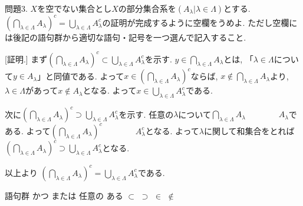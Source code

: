 \documentclass[dvipdfmx,a4paper,11pt]{article}
\theoremstyle{definition}
\begin{document}

\medskip
問題3.  $X$を空でない集合とし$X$の部分集合系を$(A_{\lambda} | \lambda \in \Lambda)$とする. $(\bigcap_{\lambda \in \Lambda}A_{\lambda})^c = \bigcup_{\lambda \in \Lambda}A_{\lambda}^c$の証明が完成するように空欄をうめよ. 
ただし空欄には後記の語句群から適切な語句・記号を一つ選んで記入すること.

[証明.]
まず$(\bigcap_{\lambda \in \Lambda}A_{\lambda})^c  \subset \bigcup_{\lambda \in \Lambda}A_{\lambda}^c$を示す.
$y \in  \bigcap_{\lambda \in \Lambda}A_{\lambda}$とは, 「\boxed{\phantom{hogehoge}}$\lambda \in \Lambda$について$y \in A_\lambda$」と同値である. 
よって$x \in (\bigcap_{\lambda \in \Lambda}A_{\lambda})^c$ならば, $x \not \in \bigcap_{\lambda \in \Lambda}A_{\lambda}$より, \boxed{\phantom{hogehoge}}$\lambda \in \Lambda$があって$x \not \in A_{\lambda}$となる. よって$x \in \bigcup_{\lambda \in \Lambda}A_{\lambda}^c$である.

次に$(\bigcap_{\lambda \in \Lambda}A_{\lambda})^c  \supset \bigcup_{\lambda \in \Lambda}A_{\lambda}^c$を示す.
任意の$\lambda$について$\bigcap_{\lambda \in \Lambda}A_{\lambda} \boxed{\phantom{hogehoge}} A_{\lambda}$である.
よって$(\bigcap_{\lambda \in \Lambda}A_{\lambda})^c \boxed{\phantom{hogehoge}} A_{\lambda}^c$となる. 
よって$\lambda$に関して和集合をとれば$(\bigcap_{\lambda \in \Lambda}A_{\lambda})^c  \supset \bigcup_{\lambda \in \Lambda}A_{\lambda}^c$となる.

以上より $(\bigcap_{\lambda \in \Lambda}A_{\lambda})^c = \bigcup_{\lambda \in \Lambda}A_{\lambda}^c$である. 

\medskip
\begin{itembox}[l]{語句群}
かつ \quad または \quad 任意の \quad ある \quad $\subset$ \quad $\supset$
\quad $\in$ \quad $\not\in$ 
\end{itembox}
\end{document}
